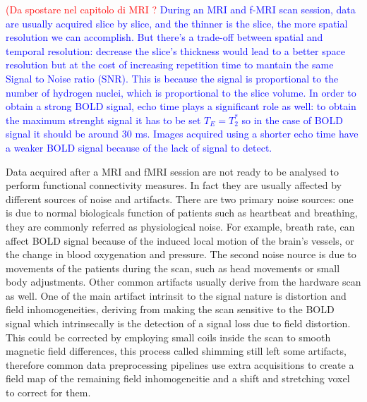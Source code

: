 \documentclass[10pt]{report}
\begin{document}
\textcolor{red}{(Da spostare nel capitolo di MRI ?} \textcolor{blue}{ During an MRI and f-MRI scan session, data are usually acquired slice by slice, and the thinner is the slice, the more spatial resolution we can accomplish.
But there's a trade-off between spatial and temporal resolution: decrease the slice's thickness would lead to a better space resolution but at the cost of increasing repetition time to mantain the same Signal to Noise ratio (SNR).
This is because the signal is proportional to the number of hydrogen nuclei, which is proportional to the slice volume.
In order to obtain a strong BOLD signal, echo time plays a significant role as well: to obtain the maximum strenght signal it has to be set $T_E = T_2^{\ast}$ so in the case of BOLD signal it should be around 30 ms.
Images acquired using a shorter echo time have a weaker BOLD signal because of the lack of signal to detect. \cite{jenkinson2018}
}

Data acquired after a MRI and fMRI session are not ready to be analysed to perform functional connectivity measures. In fact they are usually affected by different sources of noise and artifacts.
There are two primary noise sources: one is due to normal biologicals function of patients such as heartbeat and breathing, they are commonly referred as physiological noise. For example, breath rate, can affect BOLD signal because of the induced local motion of the brain's vessels, or the change in blood oxygenation and pressure. The second noise nource is due to movements of the patients during the scan, such as head movements or small body adjustments.
Other common artifacts usually derive from the hardware scan as well.
One of the main artifact intrinsit to the signal nature is distortion and field inhomogeneities, deriving from making the scan sensitive to the BOLD signal which intrinsecally is the detection of a signal loss due to field distortion.
This could be corrected by employing small coils inside the scan to smooth magnetic field differences, this process called shimming still left some artifacts, therefore common data preprocessing pipelines use extra acquisitions to create a field map of the remaining field inhomogeneitie and a shift and stretching voxel to correct for them.\cite{bijsterbosch2017}
\end{document}
